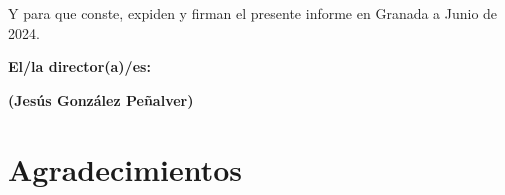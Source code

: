 \vspace{0.5cm}

Y para que conste, expiden y firman el presente informe en Granada a Junio de 2024.

\vspace{1cm}

\textbf{El/la director(a)/es: }

\vspace{5cm}

\noindent \textbf{(Jesús González Peñalver)}

\chapter*{Agradecimientos}

%
%




